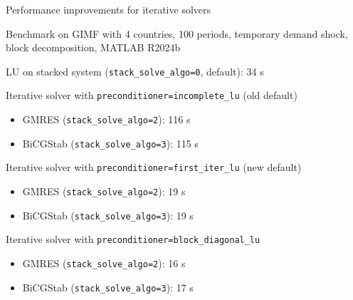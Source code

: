 \documentclass[handout,usepdftitle=false,xcolor=dvipsnames,aspectratio=169]{beamer}
\begin{document}
\begin{frame}{Performance improvements for iterative solvers}
  \begin{witemize}
    \item Benchmark on GIMF with 4 countries, 100 periods, temporary demand
          shock, block decomposition, MATLAB R2024b
    \item LU on stacked system (\texttt{stack\_solve\_algo=0}, default): 34 s
    \item Iterative solver with \texttt{preconditioner=incomplete\_lu}
          (old default)
          \begin{itemize}
            \item GMRES (\texttt{stack\_solve\_algo=2}): 116 s
            \item BiCGStab (\texttt{stack\_solve\_algo=3}): 115 s
          \end{itemize}
    \item Iterative solver with \texttt{preconditioner=first\_iter\_lu} (new default)
          \begin{itemize}
            \item GMRES (\texttt{stack\_solve\_algo=2}): 19 s
            \item BiCGStab (\texttt{stack\_solve\_algo=3}): 19 s
          \end{itemize}
    \item Iterative solver with \texttt{preconditioner=block\_diagonal\_lu}
          \begin{itemize}
            \item GMRES (\texttt{stack\_solve\_algo=2}): 16 s
            \item BiCGStab (\texttt{stack\_solve\_algo=3}): 17 s
          \end{itemize}
  \end{witemize}
\end{frame}
\end{document}
